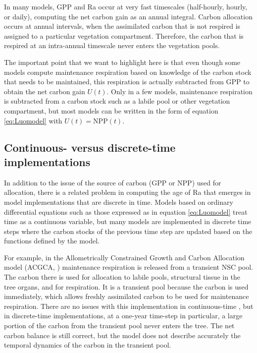 \documentclass[12pt, a4paper]{article}
\begin{document}
In many models, GPP and Ra occur at very fast timescales (half-hourly, hourly, or daily), computing the net carbon gain as an annual integral. Carbon allocation occurs at annual intervals, when the assimilated carbon that is not respired is assigned to a particular vegetation compartment. Therefore, the carbon that is respired at an intra-annual timescale never enters the vegetation pools.

The important point that we want to highlight here is that even though some models compute maintenance respiration based on knowledge of the carbon stock that needs to be maintained, this respiration is actually subtracted from GPP to obtain the net carbon gain $U(t)$. Only in a few models, maintenance respiration is subtracted from a carbon stock such as a labile pool or other vegetation compartment, but most models can be written in the form of equation \eqref{eq:Luomodel} with $U(t) = \mathrm{NPP}(t)$. 

\subsection{Continuous- versus discrete-time implementations}
In addition to the issue of the source of carbon (GPP or NPP) used for allocation, there is a related problem in computing the age of Ra that emerges in model implementations that are discrete in time. 
Models based on ordinary differential equations such as those expressed as in equation \eqref{eq:Luomodel} treat time as a continuous variable, but many models are implemented in discrete time steps where the carbon stocks of the previous time step are updated based on the functions defined by the model. %

For example, in the Allometrically Constrained Growth and Carbon Allocation model (ACGCA, \citet{Ogle2009}) maintenance respiration is released from a transient NSC pool.
The carbon there is used for allocation to labile pools, structural tissue in the tree organs, and for respiration.
It is a transient pool because the carbon is used immediately, which allows freshly assimilated carbon to be used  for maintenance respiration.
There are no issues with this implementation in continuous-time \citep{Herrera2020}, but in discrete-time implementations, at a one-year time-step in particular, a large portion of the carbon from the transient pool
never enters the tree.
The net carbon balance is still correct, but the model does not describe accurately the temporal dynamics of the carbon in the transient pool.
\end{document}
